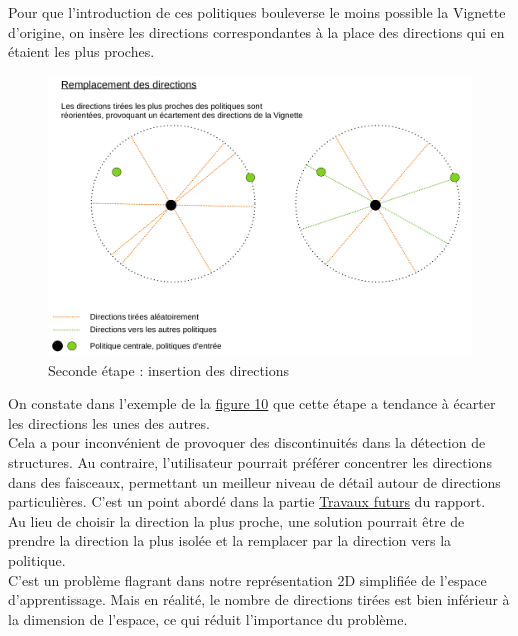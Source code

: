 \documentclass[12pt]{article}
\begin{document}
Pour que l'introduction de ces politiques bouleverse le moins possible la Vignette d'origine, on insère les directions correspondantes à la place des directions qui en étaient les plus proches. \\

\begin{figure}[htp]
    \centering
    \includegraphics[width=18cm]{Images/vignette_portee2}
    \caption{Seconde étape : insertion des directions}
    \label{fig:vignettePortee}
\end{figure}

\newpage 
On constate dans l'exemple de la \hyperref[fig:vignettePortee]{figure 10} que cette étape a tendance à écarter les directions les unes des autres. \\

Cela a pour inconvénient de provoquer des discontinuités dans la détection de structures. Au contraire, l'utilisateur pourrait préférer concentrer les directions dans des faisceaux, permettant un meilleur niveau de détail autour de directions particulières. C'est un point abordé dans la partie \hyperref[sec:future]{Travaux futurs} du rapport. \\

Au lieu de choisir la direction la plus proche, une solution pourrait être de prendre la direction la plus isolée et la remplacer par la direction vers la politique. \\

C'est un problème flagrant dans notre représentation 2D simplifiée de l'espace d'apprentissage. Mais en réalité, le nombre de directions tirées est bien inférieur à la dimension de l'espace, ce qui réduit l'importance du problème. \\
\end{document}
